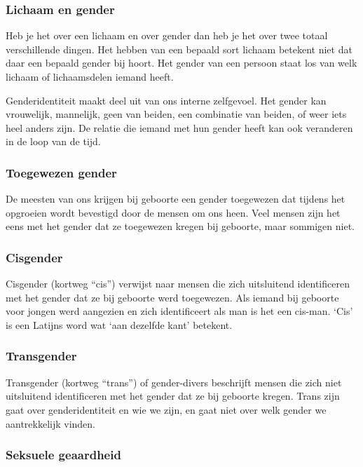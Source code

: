 \documentclass[12pt,openany]{book}
\begin{document}
\subsubsection*{Lichaam en gender}

Heb je het over een lichaam en over gender dan heb je het over twee totaal verschillende dingen. Het hebben van een bepaald sort lichaam betekent niet dat daar een bepaald gender bij hoort. Het gender van een persoon staat los van welk lichaam of lichaamsdelen iemand heeft.

Genderidentiteit maakt deel uit van ons interne zelfgevoel. Het gender kan vrouwelijk, mannelijk, geen van beiden, een combinatie van beiden, of weer iets heel anders zijn. De relatie die iemand met hun gender heeft kan ook veranderen in de loop van de tijd. 

\subsubsection*{Toegewezen gender}

De meesten van ons krijgen bij geboorte een gender toegewezen dat tijdens het opgroeien wordt bevestigd door de mensen om ons heen. Veel mensen zijn het eens met het gender dat ze toegewezen kregen bij geboorte, maar sommigen niet.  

\subsubsection*{Cisgender}

Cisgender (kortweg “cis”) verwijst naar mensen die zich uitsluitend identificeren met het gender dat ze bij geboorte werd toegewezen. Als iemand bij geboorte voor jongen werd aangezien en zich identificeert als man is het een cis-man. ‘Cis’ is een Latijns word wat ‘aan dezelfde kant’ betekent. 

\subsubsection*{Transgender} 

Transgender (kortweg “trans”) of gender-divers beschrijft mensen die zich niet uitsluitend identificeren met het gender dat ze bij geboorte kregen. Trans zijn gaat over genderidentiteit en wie we zijn, en gaat niet over welk gender we aantrekkelijk vinden.  

\subsubsection*{Seksuele geaardheid} 
\end{document}
